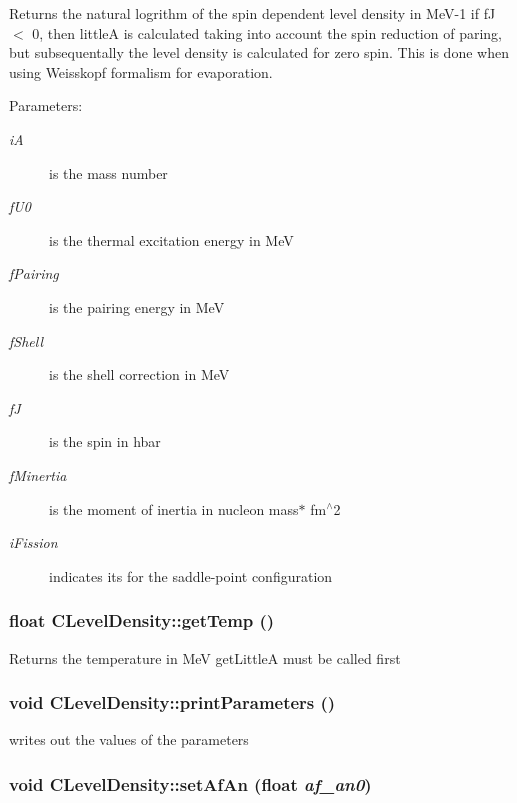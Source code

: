 Returns the natural logrithm of the spin dependent level density in Me\-V-1 if f\-J $<$ 0, then little\-A is calculated taking into account the spin reduction of paring, but subsequentally the level density is calculated for zero spin. This is done when using Weisskopf formalism for evaporation. \begin{Desc}
\item[Parameters:]
\begin{description}
\item[{\em i\-A}]is the mass number \item[{\em f\-U0}]is the thermal excitation energy in Me\-V \item[{\em f\-Pairing}]is the pairing energy in Me\-V \item[{\em f\-Shell}]is the shell correction in Me\-V \item[{\em f\-J}]is the spin in hbar \item[{\em f\-Minertia}]is the moment of inertia in nucleon mass$\ast$ fm$^\wedge$2 \item[{\em i\-Fission}]indicates its for the saddle-point configuration \end{description}
\end{Desc}
\subsubsection{\setlength{\rightskip}{0pt plus 5cm}float CLevel\-Density::get\-Temp ()}\label{classCLevelDensity_e6c46c1ad332b9588dd9bb19f3d2d4b9}


Returns the temperature in Me\-V get\-Little\-A must be called first 
\subsubsection{\setlength{\rightskip}{0pt plus 5cm}void CLevel\-Density::print\-Parameters ()\hspace{0.3cm}{\tt  [static]}}\label{classCLevelDensity_36a2a7b8bed24bcff27e47c51cc2134d}


writes out the values of the parameters 
\subsubsection{\setlength{\rightskip}{0pt plus 5cm}void CLevel\-Density::set\-Af\-An (float {\em af\_\-an0})\hspace{0.3cm}{\tt  [static]}}\label{classCLevelDensity_cc0135aa7baed8b5748e0bff737f9502}


